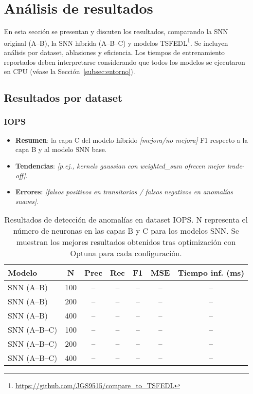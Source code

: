 \section{Análisis de resultados}

En esta sección se presentan y discuten los resultados, comparando la SNN original (A--B), la SNN híbrida (A--B--C) y modelos TSFEDL\footnote{\url{https://github.com/JGS9515/compare_to_TSFEDL}}. Se incluyen análisis por dataset, ablasiones y eficiencia.  Los tiempos de entrenamiento reportados deben interpretarse considerando que todos los modelos se ejecutaron en CPU (véase la Sección~\ref{subsec:entorno}).

\subsection{Resultados por dataset}

\subsubsection{IOPS}
\begin{itemize}
    \item \textbf{Resumen}: la capa C del modelo híbrido \textit{[mejora/no mejora]} F1 respecto a la capa B y al modelo SNN base.
    \item \textbf{Tendencias}: \textit{[p.ej., kernels gaussian con weighted\_sum ofrecen mejor trade-off]}.
    \item \textbf{Errores}: \textit{[falsos positivos en transitorios / falsos negativos en anomalías suaves]}.
\end{itemize}

\begin{table}[htbp]
\centering
\small
\begin{tabular}{lcccccc}
\hline\hline
\textbf{Modelo} & \textbf{N} & \textbf{Prec} & \textbf{Rec} & \textbf{F1} & \textbf{MSE} & \textbf{Tiempo inf. (ms)} \\
\hline
SNN (A--B) & 100 & -- & -- & -- & -- & -- \\
SNN (A--B) & 200 & -- & -- & -- & -- & -- \\
SNN (A--B) & 400 & -- & -- & -- & -- & -- \\
\hline
SNN (A--B--C) & 100 & -- & -- & -- & -- & -- \\
SNN (A--B--C) & 200 & -- & -- & -- & -- & -- \\
SNN (A--B--C) & 400 & -- & -- & -- & -- & -- \\
\hline\hline
\end{tabular}
\caption{Resultados de detección de anomalías en dataset IOPS. N representa el número de neuronas en las capas B y C para los modelos SNN. Se muestran los mejores resultados obtenidos tras optimización con Optuna para cada configuración.}
\label{tab:resultados-iops-escalabilidad}
\end{table}



